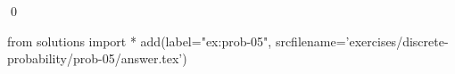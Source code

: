 
\begin{ex} 
  \label{ex:prob-05}
  
  \qed
\end{ex} 
\begin{python0}
from solutions import *
add(label="ex:prob-05",
    srcfilename='exercises/discrete-probability/prob-05/answer.tex') 
\end{python0}
